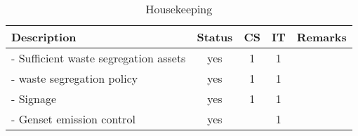 \begin{table}[h]
    \caption{Housekeeping}
    \label{ch05_tbl_housekeeping}
    \footnotesize{

\begin{tabular}{l|c|c|c|l}
\hline
Description & Status & CS & IT & Remarks \\ 
\hline
- Sufficient waste segregation assets & yes & 1 & 1 &  \\ 
- waste segregation policy & yes & 1 & 1 &  \\ 
- Signage & yes & 1 & 1 &  \\ 
- Genset emission control & yes &  & 1 &  \\ 
\hline
\end{tabular}
}

\end{table}
